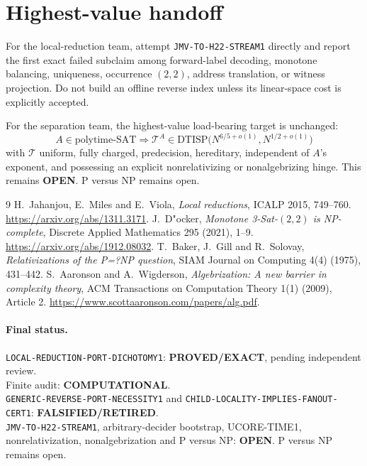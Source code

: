\documentclass[11pt]{article}
\newcommand{\EXACT}{\textbf{PROVED/EXACT}}
\newcommand{\OPEN}{\textbf{OPEN}}
\newcommand{\RETIRED}{\textbf{FALSIFIED/RETIRED}}
\newcommand{\COMP}{\textbf{COMPUTATIONAL}}
\begin{document}
\section{Highest-value handoff}

For the local-reduction team, attempt \texttt{JMV-TO-H22-STREAM1} directly
and report the first exact failed subclaim among forward-label decoding,
monotone balancing, uniqueness, occurrence $(2,2)$, address translation, or
witness projection.  Do not build an offline reverse index unless its
linear-space cost is explicitly accepted.

For the separation team, the highest-value load-bearing target is unchanged:
\[
 \boxed{
 A\in\mathrm{polytime\text{-}SAT}
 \Longrightarrow
 \mathcal T^A\in
 \mathrm{DTISP}\bigl(N^{6/5+o(1)},N^{1/2+o(1)}\bigr)
 }
\]
with $\mathcal T$ uniform, fully charged, predecision, hereditary, independent
of $A$'s exponent, and possessing an explicit nonrelativizing or
nonalgebrizing hinge.  This remains \OPEN.  P versus NP remains open.

\begin{thebibliography}{9}
 H.~Jahanjou, E.~Miles and E.~Viola,
\emph{Local reductions}, ICALP 2015, 749--760.
\url{https://arxiv.org/abs/1311.3171}.
 J.~D"ocker,
\emph{Monotone 3-Sat-$(2,2)$ is NP-complete},
Discrete Applied Mathematics 295 (2021), 1--9.
\url{https://arxiv.org/abs/1912.08032}.
 T.~Baker, J.~Gill and R.~Solovay,
\emph{Relativizations of the P=?NP question}, SIAM Journal on Computing
4(4) (1975), 431--442.
 S.~Aaronson and A.~Wigderson,
\emph{Algebrization: A new barrier in complexity theory}, ACM Transactions
on Computation Theory 1(1) (2009), Article 2.
\url{https://www.scottaaronson.com/papers/alg.pdf}.
\end{thebibliography}

\paragraph{Final status.}
\texttt{LOCAL-REDUCTION-PORT-DICHOTOMY1}: \EXACT, pending independent review.\\
Finite audit: \COMP.\\
\texttt{GENERIC-REVERSE-PORT-NECESSITY1} and
\texttt{CHILD-LOCALITY-IMPLIES-FANOUT-CERT1}: \RETIRED.\\
\texttt{JMV-TO-H22-STREAM1}, arbitrary-decider bootstrap, UCORE-TIME1,
nonrelativization, nonalgebrization and P versus NP: \OPEN.
P versus NP remains open.

\end{document}
